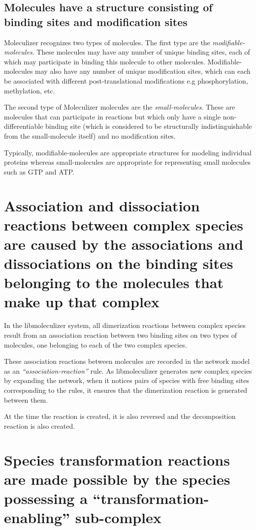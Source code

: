 \subsection{Molecules have a structure consisting of binding sites and
  modification sites}

Moleculizer recognizes two types of molecules.  The first type are the
{\it modifiable-molecules}.  These molecules may have any number of unique
binding sites, each of which may participate in binding this molecule
to other molecules.  Modifiable-molecules may also have any number of
unique modification sites, which can each be associated with different
post-translational modifications e.g phosphorylation, methylation, etc.

The second type of Moleculizer molecules are the {\it small-molecules}.
These are molecules that can participate in reactions but which only
have a single non-differentiable binding site (which is considered to
be structurally indistinguishable from the small-molecule itself) and no
modification sites.

Typically, modifiable-molecules are appropriate structures for
modeling individual proteins whereas small-molecules are appropriate
for representing small molecules such as GTP and ATP.

\section{Association and dissociation reactions between complex
  species are caused by the associations and dissociations on the
  binding sites belonging to the molecules that make up that complex}

In the libmoleculizer system, all dimerization reactions between
complex species result from an association reaction between two
binding sites on two types of molecules, one belonging to each of the
two complex species.  

These association reactions between molecules are recorded in the
network model as an {\it ``association-reaction''} rule.  As libmoleculizer
generates new complex species by expanding the network, when it
notices pairs of species with free binding sites corresponding to the
rules, it ensures that the dimerization reaction is generated between
them.

At the time the reaction is created, it is also reversed and the
decomposition reaction is also created.  

\section{Species transformation reactions are made possible by the
  species possessing a ``transformation-enabling'' sub-complex}

